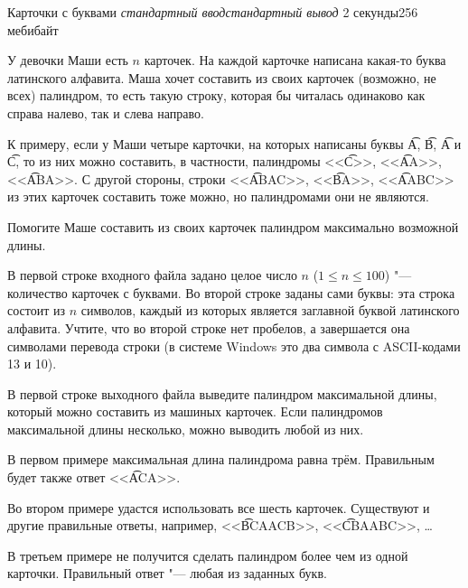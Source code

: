 
\gdef\thisproblemauthor{Иван Казменко}
\begin{problem}{Карточки с буквами}
{\textsl{стандартный ввод}}{\textsl{стандартный вывод}}
{2 секунды}{256 мебибайт}{}

У девочки Маши есть $n$ карточек.
На каждой карточке написана какая-то буква латинского алфавита.
Маша хочет составить из своих карточек (возможно, не всех) палиндром,
то есть такую строку, которая бы читалась одинаково как справа налево,
так и слева направо.

К примеру, если у Маши четыре карточки, на которых написаны буквы
\t{A}, \t{B}, \t{A} и \t{C}, то из них можно составить, в частности,
палиндромы <<\t{C}>>, <<\t{AA}>>, <<\t{ABA}>>.
С другой стороны, строки <<\t{ABAC}>>, <<\t{BA}>>, <<\t{AABC}>> из этих
карточек составить тоже можно, но палиндромами они не являются.

Помогите Маше составить из своих карточек палиндром
максимально возможной длины.

\InputFile

В первой строке входного файла задано целое число $n$ ($1 \le n \le 100$) "---
количество карточек с буквами.
Во второй строке заданы сами буквы: эта строка состоит из $n$ символов,
каждый из которых является заглавной буквой латинского алфавита.
Учтите, что во второй строке нет пробелов, а завершается она символами
перевода строки (в системе Windows это два символа с ASCII-кодами 13 и 10).

\OutputFile

В первой строке выходного файла выведите палиндром максимальной длины,
который можно составить из машиных карточек.
Если палиндромов максимальной длины несколько, можно выводить любой из них.

\Examples

\begin{example}%
%
%
%
\end{example}

\Explanations

В первом примере максимальная длина палиндрома равна трём.
Правильным будет также ответ <<\t{ACA}>>.

Во втором примере удастся использовать все шесть карточек.
Существуют и другие правильные ответы, например,
<<\t{BCAACB}>>, <<\t{CBAABC}>>, \ldots

В третьем примере не получится сделать палиндром более чем из одной карточки.
Правильный ответ "--- любая из заданных букв.

%

\end{problem}
